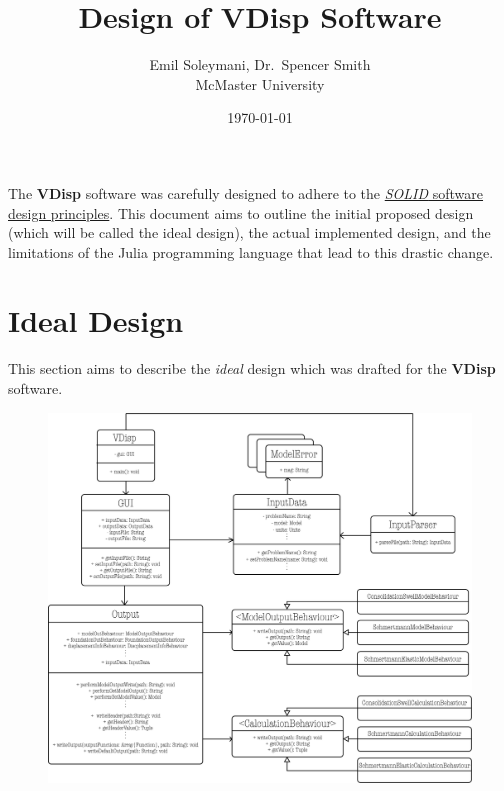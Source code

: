 \documentclass[11pt,fleqn]{article}
\newcommand{\indentpar}{\phantom{=}}
\begin{document}
      
      \title{Design of VDisp Software}
      \date{\today}
      \author{Emil Soleymani, Dr.~Spencer Smith\\ McMaster University}
      \maketitle

      \medskip

      \indentpar The \textbf{VDisp} software was carefully designed to adhere to the \href{https://www.digitalocean.com/community/conceptual_articles/s-o-l-i-d-the-first-five-principles-of-object-oriented-design}{\emph{SOLID} software design principles}.
      This document aims to outline the initial proposed design (which will be called the ideal design), the actual implemented
      design, and the limitations of the Julia programming language that lead to this drastic change.
      
    
    \pagebreak

    \section*{Ideal Design}

    \indentpar This section aims to describe the \emph{ideal} design which was drafted
    for the \textbf{VDisp} software. \\

    \begin{figure}[h]
        \includegraphics[width=1.3\textwidth]{VDispIdealDesignUML.png}
        \centering
    \end{figure}
\end{document}
